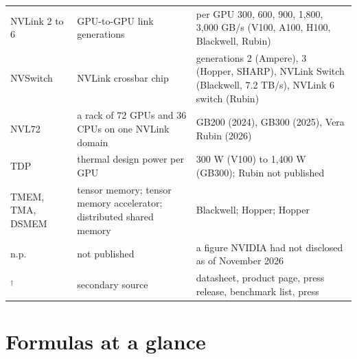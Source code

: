 \documentclass[11pt,letterpaper]{article}
\begin{document}
\begin{center}
\begin{tabular}{@{}lp{4.6cm}p{6.3cm}@{}}
NVLink 2 to 6 & GPU-to-GPU link generations & per GPU 300, 600, 900, 1{,}800, 3{,}000 GB/s (V100, A100, H100, Blackwell, Rubin)\\
NVSwitch & NVLink crossbar chip & generations 2 (Ampere), 3 (Hopper, SHARP), NVLink Switch (Blackwell, 7.2 TB/s), NVLink 6 switch (Rubin)\\
NVL72 & a rack of 72 GPUs and 36 CPUs on one NVLink domain & GB200 (2024), GB300 (2025), Vera Rubin (2026)\\
TDP & thermal design power per GPU & 300 W (V100) to 1{,}400 W (GB300); Rubin not published\\
TMEM, TMA, DSMEM & tensor memory; tensor memory accelerator; distributed shared memory & Blackwell; Hopper; Hopper\\
n.p. & not published & a figure NVIDIA had not disclosed as of November 2026\\
$^\dagger$ & secondary source & datasheet, product page, press release, benchmark list, press\\
\bottomrule
\end{tabular}
\end{center}

\clearpage
\section{Formulas at a glance}
\end{document}
